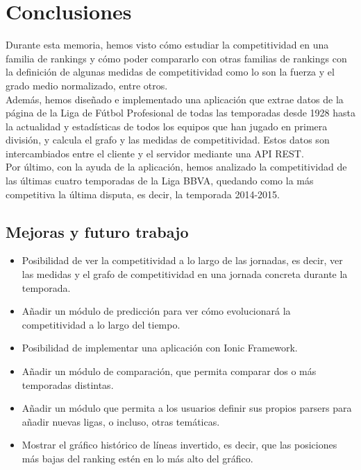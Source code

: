 \chapter{Conclusiones}

Durante esta memoria, hemos visto cómo estudiar la competitividad en una familia de rankings y cómo poder compararlo con otras familias de rankings con la definición de algunas medidas de competitividad como lo son la fuerza y el grado medio normalizado, entre otros.\\

Además, hemos diseñado e implementado una aplicación que extrae datos de la página de la Liga de Fútbol Profesional de todas las temporadas desde 1928 hasta la actualidad y estadísticas de todos los equipos que han jugado en primera división, y calcula el grafo y las medidas de competitividad. Estos datos son intercambiados entre el cliente y el servidor mediante una API REST.\\

Por último, con la ayuda de la aplicación, hemos analizado la competitividad de las últimas cuatro temporadas de la Liga BBVA, quedando como la más competitiva la última disputa, es decir, la temporada 2014-2015.

\section{Mejoras y futuro trabajo}

\begin{itemize}
\item Posibilidad de ver la competitividad a lo largo de las jornadas, es decir, ver las medidas y el grafo de competitividad en una jornada concreta durante la temporada.

\item Añadir un módulo de predicción para ver cómo evolucionará la competitividad a lo largo del tiempo.

\item Posibilidad de implementar una aplicación con Ionic Framework.

\item Añadir un módulo de comparación, que permita comparar dos o más temporadas distintas.

\item Añadir un módulo que permita a los usuarios definir sus propios parsers para añadir nuevas ligas, o incluso, otras temáticas.

\item Mostrar el gráfico histórico de líneas invertido, es decir, que las posiciones más bajas del ranking estén en lo más alto del gráfico.
\end{itemize}
